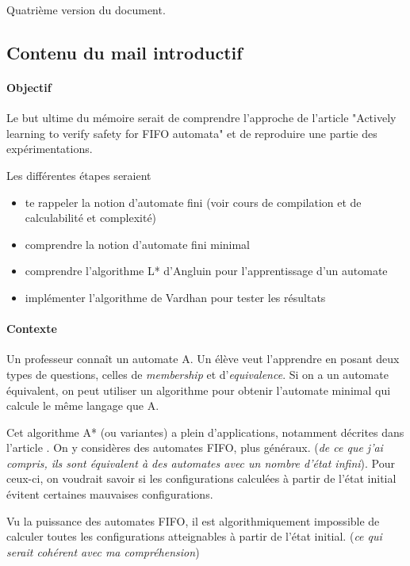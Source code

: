 Quatrième version du document.

\subsection*{Contenu du mail introductif}

\paragraph{Objectif}

Le but ultime du mémoire serait de comprendre l’approche de l’article "Actively learning to verify safety for FIFO automata" \cite{Vardhan04} et de reproduire une partie des expérimentations.

Les différentes étapes seraient
\begin{itemize}
	\item te rappeler la notion d’automate fini (voir cours de compilation et de calculabilité et complexité)
	\item comprendre la notion d’automate fini minimal
	\item comprendre l’algorithme L* d’Angluin pour l’apprentissage d’un automate
	\item implémenter l'algorithme de Vardhan pour tester les résultats
\end{itemize}


\paragraph{Contexte}

Un professeur connaît un automate A. Un élève veut l'apprendre en posant deux types de questions, celles de \emph{membership} et d'\emph{equivalence}. Si on a un automate équivalent, on peut utiliser un algorithme pour obtenir l'automate minimal qui calcule le même langage que A.

Cet algorithme A* (ou variantes) a plein d'applications, notamment décrites dans l'article \cite{Vardhan04}. On y considères des automates FIFO, plus généraux. (\emph{de ce que j'ai compris, ils sont équivalent à des automates avec un nombre d'état infini}). Pour ceux-ci, on voudrait savoir si les configurations calculées à partir de l’état initial évitent certaines mauvaises configurations.

Vu la puissance des automates FIFO, il est algorithmiquement impossible de calculer toutes les configurations atteignables à partir de l’état initial. (\emph{ce qui serait cohérent avec ma compréhension})

